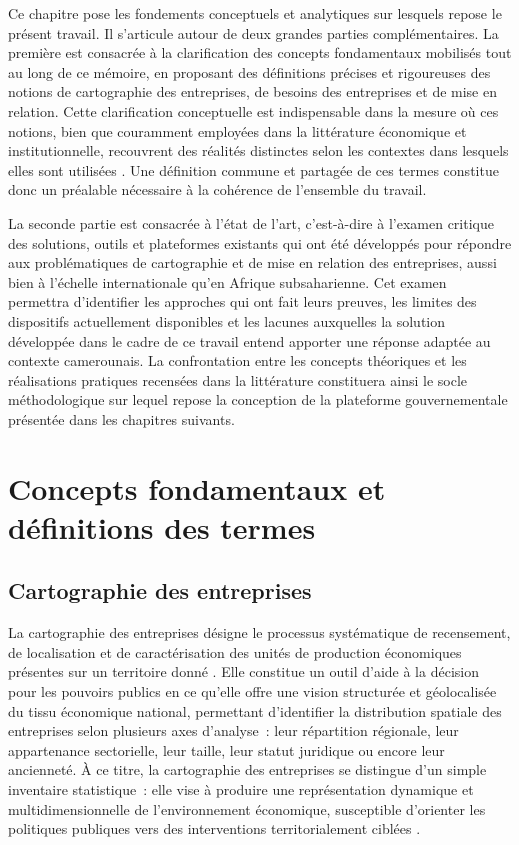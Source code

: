 \documentclass[]{article}
\title{}
\author{}
\begin{document}
	
	
	Ce chapitre pose les fondements conceptuels et analytiques sur lesquels repose
	le présent travail. Il s'articule autour de deux grandes parties complémentaires.
	La première est consacrée à la clarification des concepts fondamentaux mobilisés
	tout au long de ce mémoire, en proposant des définitions précises et rigoureuses
	des notions de cartographie des entreprises, de besoins des entreprises et de mise
	en relation. Cette clarification conceptuelle est indispensable dans la mesure où
	ces notions, bien que couramment employées dans la littérature économique et
	institutionnelle, recouvrent des réalités distinctes selon les contextes dans
	lesquels elles sont utilisées \citep{oecd_sme_2021}. Une définition commune et
	partagée de ces termes constitue donc un préalable nécessaire à la cohérence de
	l'ensemble du travail.
	
	La seconde partie est consacrée à l'état de l'art, c'est-à-dire à l'examen
	critique des solutions, outils et plateformes existants qui ont été développés
	pour répondre aux problématiques de cartographie et de mise en relation des
	entreprises, aussi bien à l'échelle internationale qu'en Afrique subsaharienne.
	Cet examen permettra d'identifier les approches qui ont fait leurs preuves, les
	limites des dispositifs actuellement disponibles et les lacunes auxquelles la
	solution développée dans le cadre de ce travail entend apporter une réponse
	adaptée au contexte camerounais. La confrontation entre les concepts théoriques
	et les réalisations pratiques recensées dans la littérature constituera ainsi le
	socle méthodologique sur lequel repose la conception de la plateforme gouvernementale
	présentée dans les chapitres suivants.
	\label{chap:etat_art}
	
	\section{Concepts fondamentaux et définitions des termes}
	\label{sec:concepts}
	
	\subsection{Cartographie des entreprises}
	
	La cartographie des entreprises désigne le processus systématique de recensement,
	de localisation et de caractérisation des unités de production économiques présentes
	sur un territoire donné \citep{ins_rge_2023}. Elle constitue un outil d'aide à la
	décision pour les pouvoirs publics en ce qu'elle offre une vision structurée et
	géolocalisée du tissu économique national, permettant d'identifier la distribution
	spatiale des entreprises selon plusieurs axes d'analyse~: leur répartition régionale,
	leur appartenance sectorielle, leur taille, leur statut juridique ou encore leur
	ancienneté. À ce titre, la cartographie des entreprises se distingue d'un simple
	inventaire statistique~: elle vise à produire une représentation dynamique et
	multidimensionnelle de l'environnement économique, susceptible d'orienter les
	politiques publiques vers des interventions territorialement ciblées
	\citep{world_bank_2020}.
	
\end{document}
